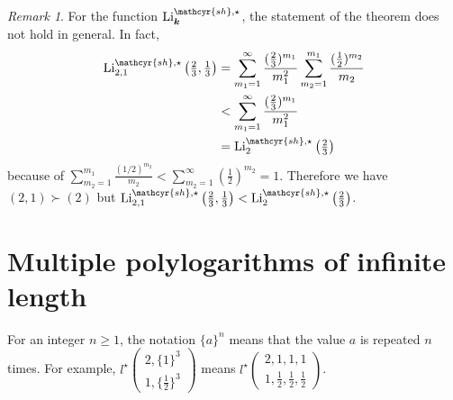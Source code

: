 \documentclass[12pt,a4paper]{article}
\theoremstyle{remark}
\newtheorem{rem}[defi]{Remark}
\begin{document}
\begin{rem}
For the function
${\rm Li}_{\boldsymbol{k}}^{\mathcyr{sh},\star}$,
the statement of the theorem 
does not hold in general.
In fact, 
\begin{align*}
{\rm Li}_{2,1}^{\mathcyr{sh},\star} \left(\tfrac{2}{3}, \tfrac{1}{3}\right)
&=\sum_{m_1=1}^{\infty} \frac{(\frac{2}{3})^{m_1}}{m_1^2} \sum_{m_2=1}^{m_1}\frac{ (\frac{1}{2})^{m_2}}{m_2}\\
&< \sum_{m_1=1}^{\infty} \frac{(\frac{2}{3})^{m_1}}{m_1^2}\\
&={\rm Li}_{2}^{\mathcyr{sh},\star} \left(\tfrac{2}{3}\right)
\end{align*}
because of 
$\sum_{m_2=1}^{m_1}\frac{ (1/2)^{m_2}}{m_2}
<\sum_{m_2=1}^{\infty}\left(\frac{1}{2}\right)^{m_2}
=1$.
Therefore we have 
$(2,1) \succ (2)$ but 
${\rm Li}_{2,1}^{\mathcyr{sh},\star} \left(\tfrac{2}{3}, \tfrac{1}{3}\right)
< {\rm Li}_{2}^{\mathcyr{sh},\star} \left(\tfrac{2}{3}\right)$.
\end{rem}



\section{Multiple polylogarithms of infinite length}
\label{Multiple polylogarithms of infinite length}

For an integer $n\ge 1$, 
the notation $\{a\}^n$ means that 
the value $a$ is repeated $n$ times.
For example,
$l^{\star}
\begin{pmatrix}
2, \{1\}^{3}  \\
1, \{\tfrac{1}{2}\}^{3}  
\end{pmatrix}$
means $l^{\star}
\begin{pmatrix}
2, 1,1,1\\
1, \tfrac{1}{2}, \tfrac{1}{2},\tfrac{1}{2}  
\end{pmatrix}$.
\end{document}
